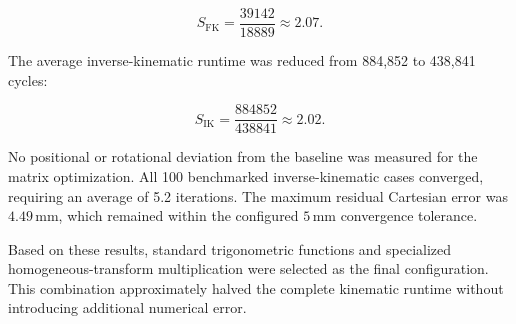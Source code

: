 \begin{equation}
    S_{\mathrm{FK}}
    =
    \frac{39142}{18889}
    \approx
    2.07.
    \label{eq:fk_speedup}
\end{equation}

The average inverse-kinematic runtime was reduced from 884,852 to 438,841 cycles:

\begin{equation}
    S_{\mathrm{IK}}
    =
    \frac{884852}{438841}
    \approx
    2.02.
    \label{eq:ik_speedup}
\end{equation}

No positional or rotational deviation from the baseline was measured for the matrix optimization. All 100 benchmarked inverse-kinematic cases converged, requiring an average of 5.2 iterations. The maximum residual Cartesian error was \(4.49\,\mathrm{mm}\), which remained within the configured \(5\,\mathrm{mm}\) convergence tolerance.

Based on these results, standard trigonometric functions and specialized homogeneous-transform multiplication were selected as the final configuration. This combination approximately halved the complete kinematic runtime without introducing additional numerical error.